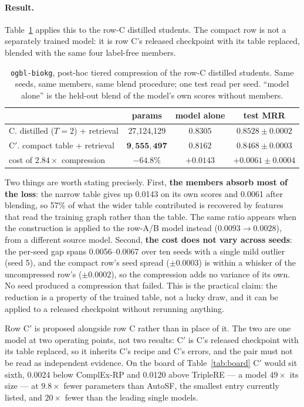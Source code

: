 \documentclass[11pt,a4paper]{article}
\begin{document}
\paragraph{Result.} Table~\ref{tab:compress} applies this to the row-C
distilled students. The compact row is not a separately trained model: it
is row C's released checkpoint with its table replaced, blended with the
same four label-free members.

\begin{table}[t]
\centering
\caption{\texttt{ogbl-biokg}, post-hoc tiered compression of the row-C
distilled students. Same seeds, same members, same blend procedure; one
test read per seed. ``model alone'' is the held-out blend of the model's
own scores without members.}
\label{tab:compress}
\footnotesize
\begin{tabular}{lccc}
\toprule
 & params & model alone & test MRR \\
\midrule
C. distilled ($T=2$) + retrieval & 27{,}124{,}129 & $0.8305$ & $0.8528\pm0.0002$ \\
C$'$. compact table + retrieval & $\mathbf{9{,}555{,}497}$ & $0.8162$ & $\mathbf{0.8468\pm0.0003}$ \\
\midrule
cost of $2.84\times$ compression & $-64.8\%$ & $+0.0143$ & $+0.0061\pm0.0004$ \\
\bottomrule
\end{tabular}
\end{table}

Two things are worth stating precisely. First, \textbf{the members absorb
most of the loss}: the narrow table gives up 0.0143 on its own scores and
0.0061 after blending, so 57\% of what the wider table
contributed is recovered by features that read the training graph rather
than the table. The same ratio appears when the construction is applied
to the row-A/B model instead ($0.0093 \to 0.0028$), from a different
source model. Second, \textbf{the cost does not vary across seeds}: the
per-seed gap spans 0.0056--0.0067 over ten seeds with a single mild
outlier (seed 5), and the compact row's seed spread ($\pm0.0003$) is
within a whisker of the uncompressed row's ($\pm0.0002$), so the compression
adds no variance of its own. No seed produced a compression that failed.
This is the practical claim: the reduction is a property of the trained
table, not a lucky draw, and it can be applied to a released checkpoint
without rerunning anything.

Row C$'$ is proposed alongside row C rather than in place of it. The two are
one model at two operating points, not two results: C$'$ is C's released
checkpoint with its table replaced, so it inherits C's recipe and C's errors,
and the pair must not be read as independent evidence. On the board of
Table~\ref{tab:board} C$'$ would sit sixth, 0.0024 below ComplEx-RP and 0.0120
above TripleRE --- a model $49\times$ its size --- at $9.8\times$ fewer
parameters than AutoSF, the smallest entry currently listed, and $20\times$
fewer than the leading single models.
\end{document}
